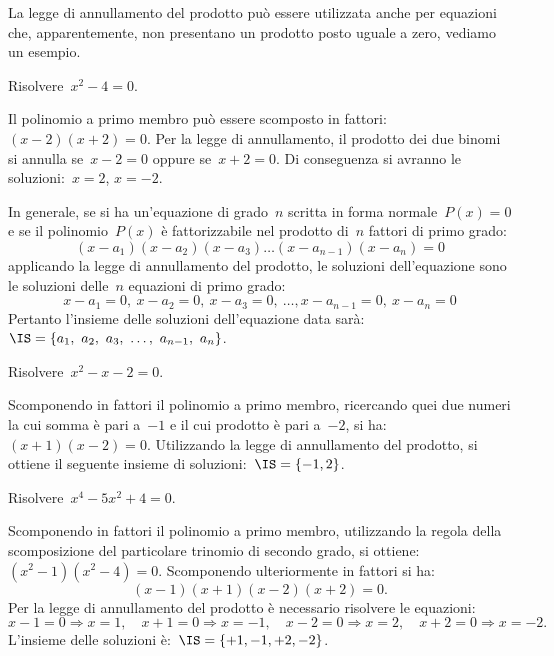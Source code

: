 La legge di annullamento del prodotto può essere utilizzata anche per 
equazioni che, apparentemente, non presentano un prodotto posto uguale a zero, 
vediamo un esempio.

 \begin{esempio}
Risolvere~\(x^{2}-4=0\).

Il polinomio a primo membro può essere scomposto in fattori:~\((x-2)(x+2)=0\).
Per la legge di annullamento, il prodotto dei due binomi si annulla se~\(x-2=0\) 
oppure se~\(x+2=0\).
Di conseguenza si avranno le soluzioni:~\(x=2\), \(x=-2\).
 \end{esempio}

In generale, se si ha un'equazione di grado~\(n\) scritta in forma 
normale~\(P(x)=0\) e se il polinomio~\(P(x)\) è fattorizzabile nel prodotto 
di~\(n\) fattori di primo grado:
\[(x-a_{1})(x-a_{2})(x-a_{3})\ldots (x-a_{n-1})(x-a_{n})=0\]
applicando la legge di annullamento del prodotto, le soluzioni dell'equazione 
sono le soluzioni delle~\(n\) equazioni di primo grado:
\[x-a_{1}=0,~x-a_{2}=0,~x-a_{3}=0,~\ldots, x-a_{n-1}=0,~x-a_{n}=0\]
Pertanto l'insieme delle soluzioni dell'equazione data 
sarà:~\(\IS=\{a_{1},~a_{2},~a_{3},~\ldots,~a_{n-1},~a_{n}\}\).

 \begin{esempio}
Risolvere~\(x^{2}-x-2=0\).

Scomponendo in fattori il polinomio a primo membro, ricercando quei due numeri 
la cui somma è pari a~\(-1\) e il cui prodotto è pari a~\(-2\), 
si ha:~\((x+1)(x-2)=0\).
Utilizzando la legge di annullamento del prodotto, si ottiene il seguente 
insieme di soluzioni:~\(\IS=\{-1,2\}\).
 \end{esempio}

 \begin{esempio}
Risolvere~\(x^{4}-5x^{2}+4=0\).

Scomponendo in fattori il polinomio a primo membro, utilizzando la regola 
della scomposizione del particolare trinomio di secondo grado, si 
ottiene:~\((x^{2}-1)(x^{2}-4)=0\). Scomponendo ulteriormente in fattori si ha:
\begin{equation*}
(x-1)(x+1)(x-2)(x+2)=0.
\end{equation*}
Per la legge di annullamento del prodotto è necessario risolvere le equazioni:
\begin{equation*}
x-1=0 \Rightarrow x=1, \quad x+1=0 \Rightarrow x=-1,\quad 
x-2=0 \Rightarrow x=2, \quad x+2=0 \Rightarrow x=-2.
\end{equation*}
L'insieme delle soluzioni è:~\(\IS=\{+1,-1,+2,-2\}\).
 \end{esempio}

